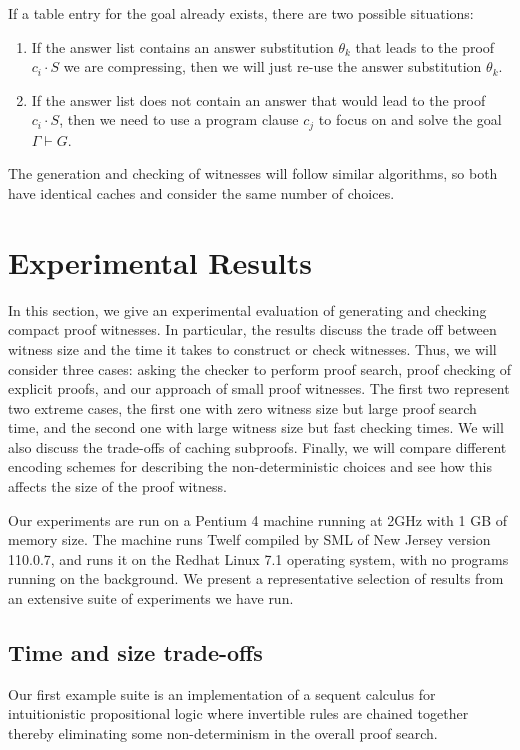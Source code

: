 \documentclass{llncs}
\newcommand{\vd}{\vdash}
\begin{document}
If a table entry for the goal already exists, there are two possible
situations:
\begin{enumerate}
\item If the answer list contains an answer substitution $\theta_k$
that leads to the proof $c_i \cdot S$ we are compressing, then we will
just re-use the answer substitution $\theta_k$.
\item If the
answer list does not contain an answer that would lead to the proof
$c_i \cdot S$, then we need to use a program clause $c_j$ to focus on
and solve the goal $\Gamma \vd G$. 
\end{enumerate}

The generation and checking of witnesses will follow similar
algorithms, so both have identical caches and consider the same number
of choices. 

\section{Experimental Results}

In this section, we give an experimental evaluation of generating and
checking compact proof witnesses. In particular, the results discuss
the trade off between witness size and the time it takes to construct
or check witnesses. Thus, we will consider three cases: asking the
checker to perform proof search, proof checking of explicit proofs,
and our approach of small proof witnesses. The first two represent two
extreme cases, the first one with zero witness size but large proof
search time, and the second one with large witness size but fast
checking times. We will also discuss the trade-offs of caching
subproofs. Finally, we will compare different encoding schemes for
describing the non-deterministic choices and see how this affects the
size of the proof witness.

Our experiments are run on a Pentium 4 machine running at 2GHz with 1
GB of memory size.  The machine runs Twelf compiled by SML of New
Jersey version 110.0.7, and runs it on the Redhat Linux 7.1 operating
system, with no programs running on the background. We present a
representative selection of results from an extensive suite of
experiments we have run.
   
\subsection{Time and size trade-offs}

Our first example suite is an implementation of a sequent calculus for
intuitionistic propositional logic where invertible rules are chained
together thereby eliminating some non-determinism in the overall proof
search.
\end{document}
